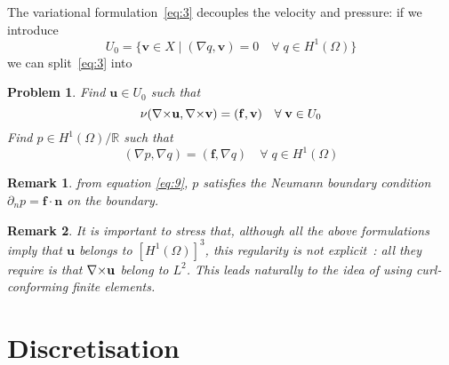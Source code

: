 \documentclass{article}
\newtheorem{problem}{Problem}
\newtheorem{remark}{Remark}
\newcommand{\ST}{\ensuremath{\; | \;}\xspace}
\newcommand{\Hp}[1][1]{\ensuremath{H^{#1}(\Omega)}\xspace}
\begin{document}
The variational formulation~\eqref{eq:3} decouples the velocity and pressure: if
we introduce
\begin{equation}
  \label{eq:7}
  U_0 = \{ \mathbf{v} \in X \ST (\nabla q, \mathbf{v}) = 0\quad \forall\; q \in \Hp\}
\end{equation}
we can split~\eqref{eq:3} into
\begin{problem}
  \label{prob:2}
  Find $\mathbf{u} \in U_0 $ such that
  \begin{equation}
    \label{eq:8}
    \nu ({\nabla\times} \mathbf{u}, {\nabla\times} \mathbf{v} )  = (\mathbf{f}, \mathbf{v}) \quad
    \forall\; \mathbf{v} \in U_0
  \end{equation}
  Find $p \in \Hp/\mathbb{R}$ such that
  \begin{equation}
    \label{eq:9}
    (\nabla p, \nabla q) = (\mathbf{f}, \nabla q)\quad \forall\; q \in \Hp
  \end{equation}
\end{problem}
\begin{remark}
  \label{rem:3}
  from equation \eqref{eq:9}, $p$ satisfies the Neumann boundary condition
  $\partial_n p = \mathbf{f} \cdot \mathbf{n}$ on the boundary.
\end{remark}
\begin{remark}
  \label{rem:4}
  It is important to stress that, although all the above formulations imply that
  $\mathbf{u}$ belongs to $[\Hp]^3$, this regularity is not explicit~: all they
  require is that ${\nabla\times}\mathbf{u}$ belong to $L^2$. This leads naturally to
  the idea of using curl-conforming finite elements.
\end{remark}

\section{Discretisation}
\label{sec:discretisation}
\end{document}
